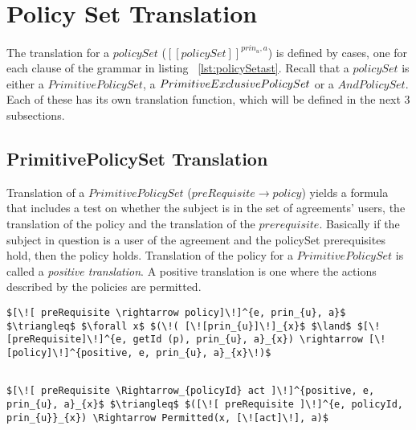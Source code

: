 \section{Policy Set Translation}
The translation for a $policySet$ ($[\![policySet]\!]^{prin_{u}, a}$) is defined by cases, one for each clause of the grammar in listing ~\ref{lst:policySetast}. Recall that a $policySet$ is either a $PrimitivePolicySet$, a $\linebreak PrimitiveExclusivePolicySet$ or a $AndPolicySet$. Each of these has its own translation function, which will be defined in the next 3 subsections.

\subsection{PrimitivePolicySet Translation}
Translation of a $PrimitivePolicySet$ ($preRequisite \rightarrow policy$) yields a formula that includes a test on whether the subject is in the set of agreements' users, the translation of the policy and the translation of the $prerequisite$. Basically if the subject in question is a user of the agreement and the policySet prerequisites hold, then the policy holds. Translation of the policy for a $PrimitivePolicySet$ is called a \emph{positive translation}. A positive translation is one where the actions described by the policies are permitted.   

\lstset{mathescape, language=AST}  
\begin{lstlisting}[frame=single, caption={Policy Set Translation {$\colon$} PrimitivePolicySet},label={lst:transpolicyformulaPrimitivePolicySet}]
$[\![ preRequisite \rightarrow policy]\!]^{e, prin_{u}, a}$ $\triangleq$ $\forall x$ $(\!( [\![prin_{u}]\!]_{x}$ $\land$ $[\![preRequisite]\!]^{e, getId (p), prin_{u}, a}_{x}) \rightarrow [\![policy]\!]^{positive, e, prin_{u}, a}_{x}\!)$
\end{lstlisting}



\lstset{mathescape, language=AST} 
\begin{lstlisting}[frame=single, caption={Positive Policy Translation {$\colon$} Single policy},label={lst:transpolicypositiveSingle}]

$[\![ preRequisite \Rightarrow_{policyId} act ]\!]^{positive, e, prin_{u}, a}_{x}$ $\triangleq$ $([\![ preRequisite ]\!]^{e, policyId, prin_{u}}_{x}) \Rightarrow Permitted(x, [\![act]\!], a)$

\end{lstlisting}


